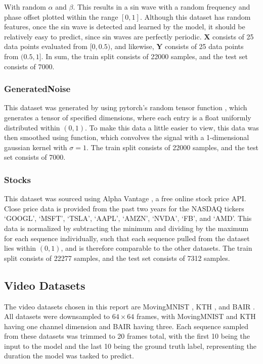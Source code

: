 \documentclass{scrartcl}
\begin{document}
With random $\alpha$ and $\beta$. This results in a sin wave with a random
frequency and phase offset plotted within the range $[0, 1]$. Although this
dataset has random features, once the sin wave is detected and learned by the
model, it should be relatively easy to predict, since sin waves are perfectly
periodic. $\boldsymbol{X}$ consists of 25 data points evaluated from $[0,
0.5)$, and likewise, $\boldsymbol{Y}$ consists of 25 data points from $(0.5,
1]$. In sum, the train split consists of 22000 samples, and the test set
consists of 7000. 

\subsubsection{GeneratedNoise}
\label{subsubsec:generatednoise_dataset}

This dataset was generated by using pytorch's random tensor function
, which generates a tensor of specified dimensions,
where each entry is a float uniformly distributed within $(0, 1)$. To make this
data a little easier to view, this data was then smoothed using
 function, which convolves
the signal with a 1-dimensional gaussian kernel with $\sigma = 1$. The train
split consists of 22000 samples, and the test set consists of 7000.

\subsubsection{Stocks}
\label{subsubsec:stocks_dataset}

This dataset was sourced using Alpha Vantage \cite{alpha_vantage}, a free
online stock price API. Close price data is provided from the past two years
for the NASDAQ tickers `GOOGL', `MSFT', `TSLA', `AAPL', `AMZN', `NVDA', `FB',
and `AMD'. This data is normalized by subtracting the minimum and dividing by
the maximum for each sequence individually, such that each sequence pulled from
the dataset lies within $(0, 1)$, and is therefore comparable to the other
datasets. The train split consists of 22277 samples, and the test set consists
of 7312 samples.

\subsection{Video Datasets}
\label{subsec:video_datasets}

The video datasets chosen in this report are MovingMNIST \cite{mmnist_dataset},
KTH \cite{kth_dataset}, and BAIR \cite{bair_dataset}. All datasets were
downsampled to $64 \times 64$ frames, with MovingMNIST and KTH having one
channel dimension and BAIR having three. Each sequence sampled from these
datasets was trimmed to 20 frames total, with the first 10 being the input to
the model and the last 10 being the ground truth label, representing the
duration the model was tasked to predict.
\end{document}
